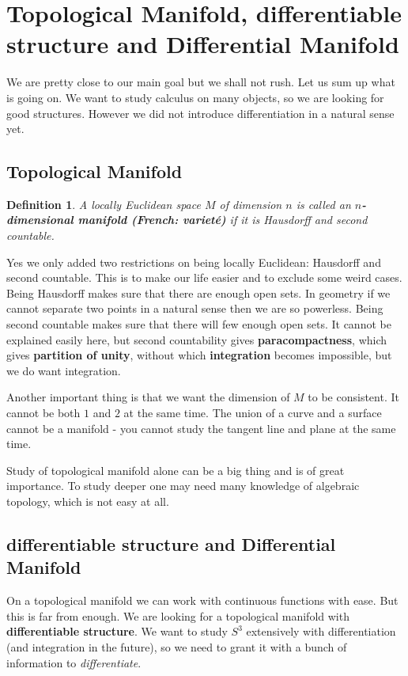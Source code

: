 \documentclass[twoside]{article}
\newtheorem{definition}{Definition}
\begin{document}
		\section{Topological Manifold, differentiable structure and Differential Manifold}
		We are pretty close to our main goal but we shall not rush. Let us sum up what is going on. We want to study calculus on many objects, so we are looking for good structures. However we did not introduce differentiation in a natural sense yet. 
			\subsection{Topological Manifold}
			\begin{definition}
				A locally Euclidean space $M$ of dimension $n$ is called an \textbf{$n$-dimensional manifold (French: varieté)} if it is Hausdorff and second countable.
			\end{definition}
			Yes we only added two restrictions on being locally Euclidean: Hausdorff and second countable. This is to make our life easier and to exclude some weird cases. Being Hausdorff makes sure that there are enough open sets. In geometry if we cannot separate two points in a natural sense then we are so powerless. Being second countable makes sure that there will few enough open sets. It cannot be explained easily here, but second countability gives \textbf{paracompactness}, which gives \textbf{partition of unity}, without which \textbf{integration} becomes impossible, but we do want integration.
			
			Another important thing is that we want the dimension of $M$ to be consistent. It cannot be both $1$ and $2$ at the same time. The union of a curve and a surface cannot be a manifold - you cannot study the tangent line and plane at the same time.  
			
			Study of topological manifold alone can be a big thing and is of great importance. To study deeper one may need many knowledge of algebraic topology, which is not easy at all.
			\subsection{differentiable structure and Differential Manifold}
			On a topological manifold we can work with continuous functions with ease. But this is far from enough. We are looking for a topological manifold with \textbf{differentiable structure}. We want to study $S^3$ extensively with differentiation (and integration in the future), so we need to grant it with a bunch of information to \textit{differentiate}.
			
\end{document}

